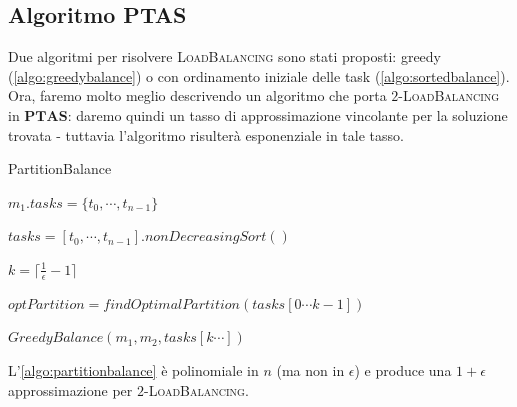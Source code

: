 \subsection{Algoritmo PTAS}
Due algoritmi per risolvere \textsc{LoadBalancing} sono stati proposti: greedy
(\cref{algo:greedybalance}) o con ordinamento iniziale delle task
(\cref{algo:sortedbalance}).
Ora, faremo molto meglio descrivendo un algoritmo che porta \textsc{$2$-LoadBalancing} in $\mathbf{PTAS}$:
daremo quindi un tasso di approssimazione vincolante per la soluzione trovata -
tuttavia l'algoritmo risulterà esponenziale in tale tasso.

\begin{algorithm}[h]
	\caption{PartitionBalance}
	\label{algo:partitionbalance}

	{
		$m_1.tasks = \{t_0, \cdots, t_{n-1}\}$

		\Return
	}

	$tasks = [t_0,\cdots, t_{n-1}].nonDecreasingSort()$

	$k = \lceil \frac{1}{\epsilon} -1 \rceil$

	$optPartition = findOptimalPartition(tasks[0\cdots k-1])$

	$GreedyBalance(m_1, m_2, tasks[k\cdots])$

\end{algorithm}

\begin{theorem}
	L'\cref{algo:partitionbalance} è polinomiale in $n$ (ma non in $\epsilon$) e
	produce una $1+ \epsilon$ approssimazione per \textsc{$2$-LoadBalancing}.
\end{theorem}

